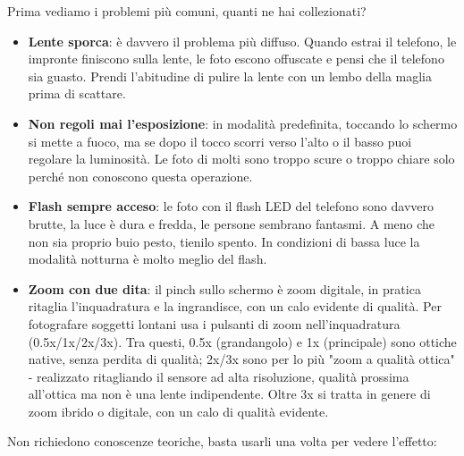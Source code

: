 


Prima vediamo i problemi più comuni, quanti ne hai collezionati?

\begin{itemize}
  \item \textbf{Lente sporca}: è davvero il problema più diffuso. Quando estrai il telefono, le impronte finiscono sulla lente, le foto escono offuscate e pensi che il telefono sia guasto. Prendi l'abitudine di pulire la lente con un lembo della maglia prima di scattare.
  \item \textbf{Non regoli mai l'esposizione}: in modalità predefinita, toccando lo schermo si mette a fuoco, ma se dopo il tocco scorri verso l'alto o il basso puoi regolare la luminosità. Le foto di molti sono troppo scure o troppo chiare solo perché non conoscono questa operazione.
  \item \textbf{Flash sempre acceso}: le foto con il flash LED del telefono sono davvero brutte, la luce è dura e fredda, le persone sembrano fantasmi. A meno che non sia proprio buio pesto, tienilo spento. In condizioni di bassa luce la modalità notturna è molto meglio del flash.
  \item \textbf{Zoom con due dita}: il pinch sullo schermo è zoom digitale, in pratica ritaglia l'inquadratura e la ingrandisce, con un calo evidente di qualità. Per fotografare soggetti lontani usa i pulsanti di zoom nell'inquadratura (0.5x/1x/2x/3x). Tra questi, 0.5x (grandangolo) e 1x (principale) sono ottiche native, senza perdita di qualità; 2x/3x sono per lo più "zoom a qualità ottica" - realizzato ritagliando il sensore ad alta risoluzione, qualità prossima all'ottica ma non è una lente indipendente. Oltre 3x si tratta in genere di zoom ibrido o digitale, con un calo di qualità evidente.
\end{itemize}


Non richiedono conoscenze teoriche, basta usarli una volta per vedere l'effetto:


